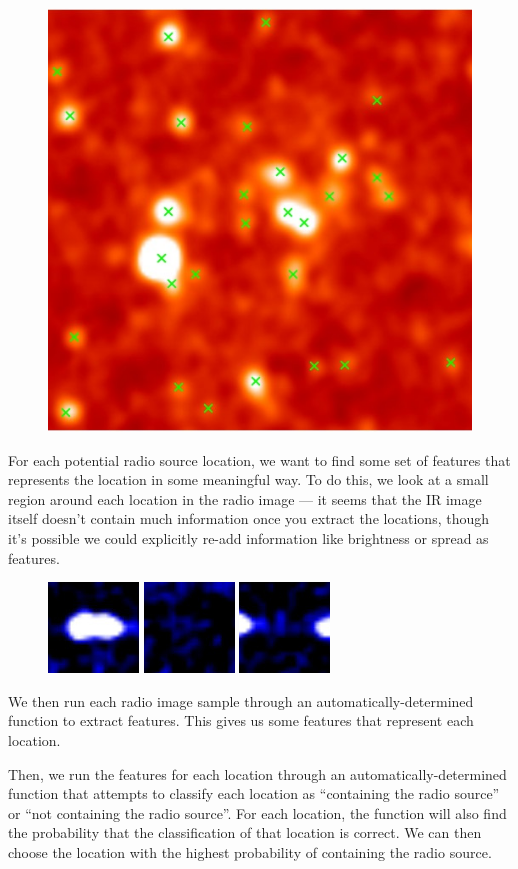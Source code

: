 \documentclass[a4paper]{article}
\begin{document}
    \begin{figure}[!ht]
        \centering
        \includegraphics[width=0.3\linewidth]{images/ARG000180p_ir_potential_hosts.jpg}
    \end{figure}

    For each potential radio source location, we want to find some set of features that represents the location in some meaningful way. To do this, we look at a small region around each location in the radio image --- it seems that the IR image itself doesn't contain much information once you extract the locations, though it's possible we could explicitly re-add information like brightness or spread as features.

    \begin{figure}[!ht]
        \centering
        \includegraphics[width=0.15\linewidth]{images/radio_neighbourhood_1.png}\quad
        \includegraphics[width=0.15\linewidth]{images/radio_neighbourhood_2.png}\quad
        \includegraphics[width=0.15\linewidth]{images/radio_neighbourhood_3.png}
    \end{figure}

    We then run each radio image sample through an automatically-determined function to extract features. This gives us some features that represent each location.

    Then, we run the features for each location through an automatically-determined function that attempts to classify each location as ``containing the radio source'' or ``not containing the radio source''. For each location, the function will also find the probability that the classification of that location is correct. We can then choose the location with the highest probability of containing the radio source.


% 
% 
\end{document}
